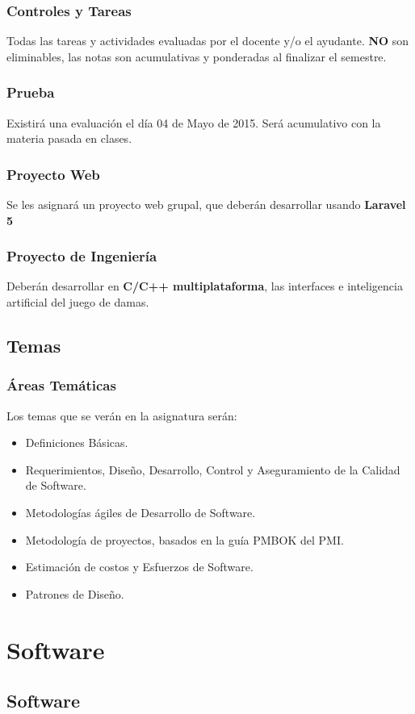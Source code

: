 \documentclass[12pt]{beamer}
\begin{document}
\begin{frame}
 \frametitle{Controles y Tareas}
 Todas las tareas y actividades evaluadas por el docente y/o el ayudante. {\bf NO} son eliminables, las notas son 
 acumulativas y ponderadas al finalizar el semestre.
\end{frame}


\begin{frame}
 \frametitle{Prueba}
 Existirá una evaluación el día 04 de Mayo de 2015. Será acumulativo con la materia pasada en clases.
\end{frame}


\begin{frame}
 \frametitle{Proyecto Web}
 Se les asignará un proyecto web grupal, que deberán desarrollar usando {\bf Laravel 5}
\end{frame}


\begin{frame}
 \frametitle{Proyecto de Ingeniería}
 Deberán desarrollar en {\bf C/C++ multiplataforma}, las interfaces e inteligencia artificial del juego de damas.
\end{frame}



\subsection{Temas}
\begin{frame}
\frametitle{Áreas Temáticas}
Los temas que se verán en la asignatura serán:
\begin{itemize}
 \item Definiciones Básicas.
 \item Requerimientos, Diseño, Desarrollo, Control y Aseguramiento de la Calidad de Software.
 \item Metodologías ágiles de Desarrollo de Software.
 \item Metodología de proyectos, basados en la guía PMBOK del PMI.
 \item Estimación de costos y Esfuerzos de Software.
 \item Patrones de Diseño.
\end{itemize}
\end{frame}



\section{Software}
\subsection{Software}
\end{document}

